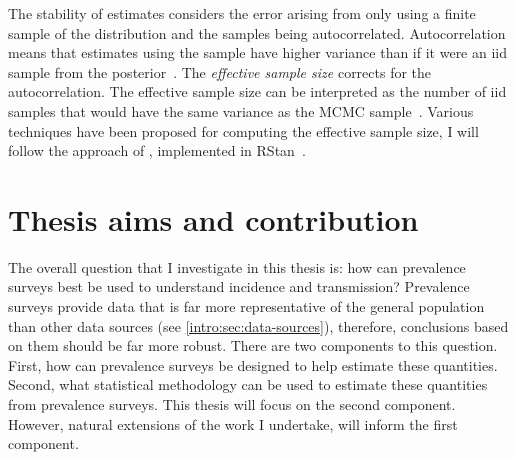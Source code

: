 \documentclass[thesis.tex]{subfiles}
\begin{document}
The stability of estimates considers the error arising from only using a finite sample of the distribution and the samples being autocorrelated.
Autocorrelation means that estimates using the sample have higher variance than if it were an iid sample from the posterior~\autocite[286]{gelmanBDA}.
The \emph{effective sample size} corrects for the autocorrelation.
The effective sample size can be interpreted as the number of iid samples that would have the same variance as the MCMC sample~\autocites[286]{gelmanBDA}{vehtariRhat}.
Various techniques have been proposed for computing the effective sample size, I will follow the approach of \textcite{vehtariRhat}, implemented in RStan~\autocite{RStan-2-32-3}.




\section{Thesis aims and contribution}

The overall question that I investigate in this thesis is: how can prevalence surveys best be used to understand incidence and transmission?
Prevalence surveys provide data that is far more representative of the general population than other data sources (see \cref{intro:sec:data-sources}), therefore, conclusions based on them should be far more robust.
There are two components to this question.
First, how can prevalence surveys be designed to help estimate these quantities.
Second, what statistical methodology can be used to estimate these quantities from prevalence surveys.
This thesis will focus on the second component.
However, natural extensions of the work I undertake, will inform the first component.
\end{document}
